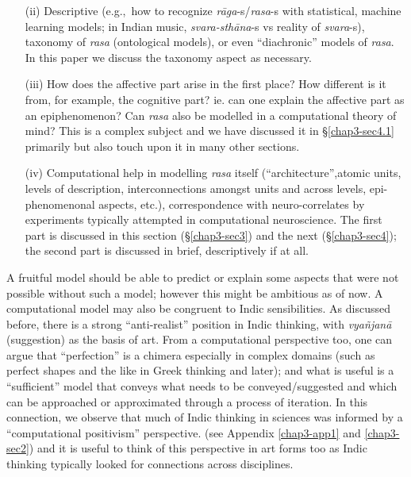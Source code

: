 \begin{itemize}
\item[(ii)] Descriptive (e.g.,~how to recognize \textsl{rāga}-s/\textsl{rasa}-s with statistical, machine learning models; in Indian music, \textsl{svara-sthāna}-s vs reality of \textsl{svara}-s), taxonomy of \textsl{rasa} (ontological models), or even “diachronic” models of \textsl{rasa}. In this paper we discuss the taxonomy aspect as necessary.

\item[(iii)] How does the affective part arise in the first place? How different is it from, for example, the cognitive part? ie. can one explain the affective part as an epiphenomenon? Can \textsl{rasa} also be modelled in a computational theory of mind? This is a complex subject and we have discussed it in \S\ref{chap3-sec4.1} primarily but also touch upon it in many other sections.

\item[(iv)] Computational help in modelling \textsl{rasa} itself (“architecture”,\break atomic units, levels of description, interconnections amongst units and across levels, epi-phenomenonal aspects, etc.), correspondence with neuro-correlates by experiments typically attempted in computational neuroscience. The first part is discussed in this section (\S\ref{chap3-sec3}) and the next (\S\ref{chap3-sec4}); the second part is discussed in brief, descriptively if at all.
\end{itemize}

A fruitful model should be able to predict or explain some aspects that were not possible without such a model; however this might be ambitious as of now. A computational model may also be congruent to Indic sensibilities. As discussed before, there is a strong “anti-realist” position in Indic thinking, with \textsl{vyañjanā} (suggestion) as the basis of art. From a computational perspective too, one can argue that “perfection” is a chimera especially in complex domains (such as perfect shapes and the like in Greek thinking and later); and what is useful is a “sufficient” model that conveys what needs to be conveyed/suggested and which can be approached or approximated through a process of iteration. In this connection, we observe that much of Indic thinking in sciences was informed by a ``computational positivism'' perspective. (see Appendix \ref{chap3-app1} and \ref{chap3-sec2}) and it is useful to think of this perspective in art forms too as Indic thinking typically looked for connections across disciplines.

